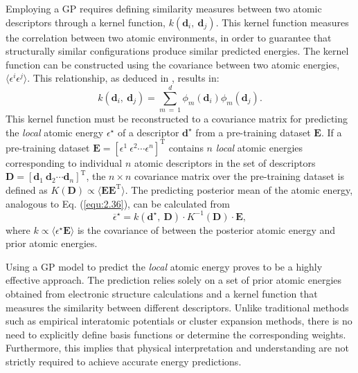 Employing a GP requires defining similarity measures between two atomic descriptors through a kernel function, $k(\textbf{d}_{i},\:\textbf{d}_{j})$.
This kernel function measures the correlation between two atomic environments, in order to guarantee that structurally similar configurations produce similar predicted energies.
The kernel function can be constructed using the covariance between two atomic energies, \( \langle \epsilon^{i} \epsilon^{j} \rangle \). This relationship, as deduced in \cite{Bartk2015}, results in:
\begin{equation}
    \label{equ:2.50}
    k(\textbf{d}_{i},\:\textbf{d}_{j}) = \sum_{m\:=\:1}^{d}\phi_{m}(\textbf{d}_{i})\phi_{m}(\textbf{d}_{j}).
\end{equation}
This kernel function must be reconstructed to a covariance matrix for predicting the \textit{local} atomic energy $\epsilon^{\star}$ of a descriptor $\textbf{d}^{\star}$ from a pre-training dataset $\textbf{E}$. 
If a pre-training dataset $\textbf{E}= \left[\epsilon^{1}\:\epsilon^{2}\cdots\epsilon^{n} \right]^{\text{T}}$ contains $n$ \textit{local} atomic energies corresponding to individual $n$ atomic descriptors in the set of descriptors $\textbf{D}= \left[\textbf{d}_{1}\:\textbf{d}_{2}\cdots\textbf{d}_{n} \right]^{\text{T}}$, the $n\times n$ covariance matrix over the pre-training dataset is defined as $K(\textbf{D}) \propto \langle \textbf{E}\textbf{E}^{\text{T}} \rangle$. 
The predicting posterior mean of the atomic energy, analogous to Eq. (\ref{equ:2.36}), can be calculated from 
\begin{equation}
    \label{equ:2.51}
    \overline{\epsilon}^{\star} = k(\textbf{d}^{\star},\:\textbf{D})\cdot K^{-1}(\textbf{D})\cdot\textbf{E},
\end{equation}
where $k\propto\langle \epsilon^{\star}\textbf{E}\rangle$ is the covariance of between the posterior atomic energy and prior atomic energies.

Using a GP model to predict the \textit{local} atomic energy proves to be a highly effective approach.
The prediction relies solely on a set of prior atomic energies obtained from electronic structure calculations and a kernel function that measures the similarity between different descriptors.
Unlike traditional methods such as empirical interatomic potentials or cluster expansion methods, there is no need to explicitly define basis functions or determine the corresponding weights.
Furthermore, this implies that physical interpretation and understanding are not strictly required to achieve accurate energy predictions.

